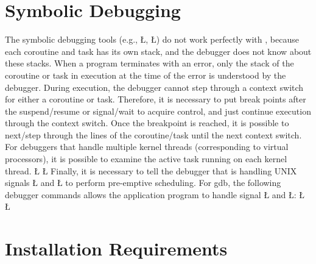 \documentclass[openright,twoside]{report}
\begin{document}
\section{Symbolic Debugging}

The symbolic debugging tools (e.g., \LGinlinetrue\LGbegin\lgrinde\L{}\endlgrinde\LGend{}, \LGinlinetrue\LGbegin\lgrinde\L{}\endlgrinde\LGend{}) do not work perfectly with \uC, because each coroutine and task has its own stack, and the debugger does not know about these stacks.
When a program terminates with an error, only the stack of the coroutine or task in execution at the time of the error is understood by the debugger.
During execution, the debugger cannot step through a context switch for either a coroutine or task.
Therefore, it is necessary to put break points after the suspend/resume or signal/wait to acquire control, and just continue execution through the context switch.
Once the breakpoint is reached, it is possible to next/step through the lines of the coroutine/task until the next context switch.
For debuggers that handle multiple kernel threads (corresponding to \uC virtual processors), it is possible to examine the active task running on each kernel thread.
\LGinlinefalse\LGbegin\lgrinde
\L{}
\L{}
\endlgrinde\LGend
Finally, it is necessary to tell the debugger that \uC is handling UNIX signals \LGinlinetrue\LGbegin\lgrinde\L{}\endlgrinde\LGend{} and \LGinlinetrue\LGbegin\lgrinde\L{}\endlgrinde\LGend{} to perform pre-emptive scheduling.
For gdb, the following debugger commands allows the application program to handle signal \LGinlinetrue\LGbegin\lgrinde\L{}\endlgrinde\LGend{} and \LGinlinetrue\LGbegin\lgrinde\L{}\endlgrinde\LGend{}:
\LGinlinefalse\LGbegin\lgrinde
\L{}
\L{}
\endlgrinde\LGend


\section{Installation Requirements}
\label{s:InstallationRequirements}
\end{document}
